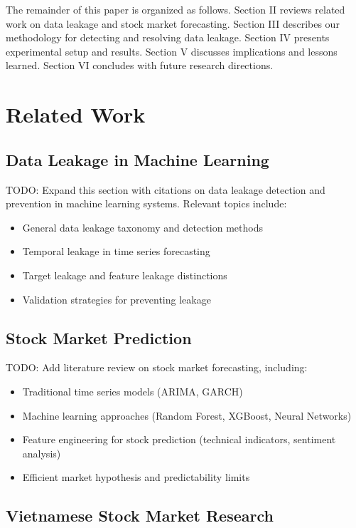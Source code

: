 \documentclass[conference]{IEEEtran}
\begin{document}
The remainder of this paper is organized as follows. Section II reviews related work on data leakage and stock market forecasting. Section III describes our methodology for detecting and resolving data leakage. Section IV presents experimental setup and results. Section V discusses implications and lessons learned. Section VI concludes with future research directions.

\section{Related Work}

\subsection{Data Leakage in Machine Learning}

TODO: Expand this section with citations on data leakage detection and prevention in machine learning systems. Relevant topics include:
\begin{itemize}
    \item General data leakage taxonomy and detection methods
    \item Temporal leakage in time series forecasting
    \item Target leakage and feature leakage distinctions
    \item Validation strategies for preventing leakage
\end{itemize}

\subsection{Stock Market Prediction}

TODO: Add literature review on stock market forecasting, including:
\begin{itemize}
    \item Traditional time series models (ARIMA, GARCH)
    \item Machine learning approaches (Random Forest, XGBoost, Neural Networks)
    \item Feature engineering for stock prediction (technical indicators, sentiment analysis)
    \item Efficient market hypothesis and predictability limits
\end{itemize}

\subsection{Vietnamese Stock Market Research}
\end{document}
